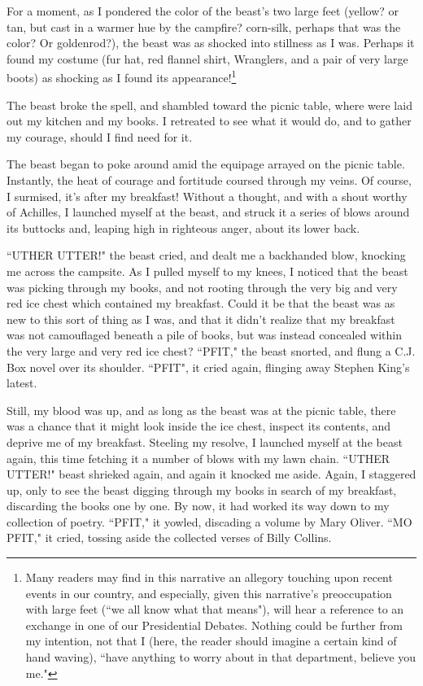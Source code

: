 For a moment, as I pondered the color of the beast's two large feet (yellow?  or tan, but cast in a warmer hue by the campfire?  corn-silk, perhaps that was the color?  Or goldenrod?), the beast was as shocked into stillness as I was.  Perhaps it found my costume (fur hat, red flannel shirt, Wranglers, and a pair of very large boots) as shocking as I found its appearance!\footnote{Many readers may find in this narrative an allegory touching upon recent events in our country, and especially, given this narrative's preoccupation with large feet (``we all know what that means"), will hear a reference to an exchange in one of our Presidential Debates.  Nothing could be further from my intention, not that I (here, the reader should imagine a certain kind of hand waving), ``have anything to worry about in that department, believe you me."}
\par
The beast broke the spell, and shambled toward the picnic table, where were laid out my kitchen and my books.  I retreated to see what it would do, and to gather my courage, should I find need for it.
\par
The beast began to poke around amid the equipage arrayed on the picnic table.  Instantly, the heat of courage and fortitude coursed through my veins.  Of course, I surmised, it's after my breakfast!  Without a thought, and with a shout worthy of Achilles, I launched myself at the beast, and struck it a series of blows around its buttocks and, leaping high in righteous anger, about its lower back.
\par
``UTHER UTTER!" the beast cried, and dealt me a backhanded blow, knocking me across the campsite.  As I pulled myself to my knees, I noticed that the beast was picking through my books, and not rooting through the very big and very red ice chest which contained my breakfast.  Could it be that the beast was as new to this sort of thing as I was, and that it didn't realize that my breakfast was not camouflaged beneath a pile of books, but was instead concealed within the very large and very red ice chest?  ``PFIT," the beast snorted, and flung a C.J. Box novel over its shoulder.  ``PFIT", it cried again, flinging away Stephen King's latest.
\par
Still, my blood was up, and as long as the beast was at the picnic table, there was a chance that it might look inside the ice chest, inspect its contents, and deprive me of my breakfast.  Steeling my resolve, I launched myself at the beast again, this time fetching it a number of blows with my lawn chain.  ``UTHER UTTER!" beast shrieked again, and again it knocked me aside.  Again, I staggered up, only to see the beast digging through my books in search of my breakfast, discarding the books one by one.  By now, it had worked its way down to my collection of poetry.  ``PFIT," it yowled, discading a volume by Mary Oliver.  ``MO PFIT," it cried, tossing aside the collected verses of Billy Collins.
